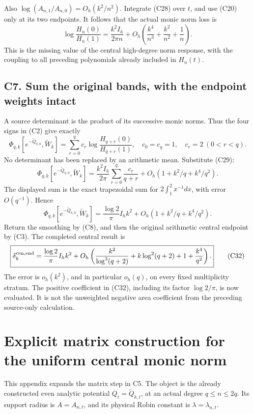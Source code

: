 \documentclass[
  11pt,
]{article}
\begin{document}
Also \(\log(A_{n,1}/A_{n,0})=O_h(k^2/n^2)\). Integrate (C28) over \(t\),
and use (C20) only at its two endpoints. It follows that the actual
monic norm loss is \[
\boxed{\log\frac{H_n(0)}{H_n(1)}
=\frac{k^2I_h}{2\pi n}
+O_h\left(\frac{k^4}{n^3}+\frac{k^2}{n^2}+\frac1n\right).}\tag{C29}
\] This is the missing value of the central high-degree norm response,
with the coupling to all preceding polynomials already included in
\(H_n(t)\).

\subsection{C7. Sum the original bands, with the endpoint weights
intact}\label{c7.-sum-the-original-bands-with-the-endpoint-weights-intact}

A source determinant is the product of its successive monic norms. Thus
the four signs in (C2) give exactly \[
\Phi_{q,k}[e^{-\widetilde Q_{k,0}},\widetilde W_k]
=\sum_{r=0}^q c_r\log\frac{H_{q+r}(0)}{H_{q+r}(1)},
\quad c_0=c_q=1,\quad c_r=2\ (0<r<q).
\tag{C30}
\] No determinant has been replaced by an arithmetic mean. Substitute
(C29): \[
\Phi_{q,k}[e^{-\widetilde Q_{k,0}},\widetilde W_k]
=\frac{k^2I_h}{2\pi}\sum_{r=0}^q\frac{c_r}{q+r}
+O_h(1+k^2/q+k^4/q^2).
\] The displayed sum is the exact trapezoidal sum for
\(2\int_1^2x^{-1}dx\), with error \(O(q^{-1})\). Hence \[
\Phi_{q,k}[e^{-\widetilde Q_{k,0}},\widetilde W_k]
=\frac{\log2}{\pi}I_h k^2+O_h(1+k^2/q+k^4/q^2).
\tag{C31}
\] Return the smoothing by (C8), and then the original arithmetic
central endpoint by (C3). The completed central result is \[
\boxed{\delta_k^{\rm cen,end}
=\frac{\log2}{\pi}I_h k^2+
O_h\left(\frac{k^2}{\log^3(q+2)}+k\log^2(q+2)+1+\frac{k^4}{q^2}\right).}\tag{C32}
\] The error is \(o_h(k^2)\), and in particular \(o_h(q)\), on every
fixed multiplicity stratum. The positive coefficient in (C32), including
its factor \(\log2/\pi\), is now evaluated. It is not the unweighted
negative area coefficient from the preceding source-only calculation.

\newpage

\section{Explicit matrix construction for the uniform central monic
norm}\label{explicit-matrix-construction-for-the-uniform-central-monic-norm}

This appendix expands the matrix step in C5. The object is the already
constructed even analytic potential \(Q_t=\widetilde Q_{k,t}\), at an
actual degree \(q\le n\le2q\). Its support radius is \(A=A_{n,t}\), and
its physical Robin constant is \(\lambda=\lambda_{n,t}\).
\end{document}
